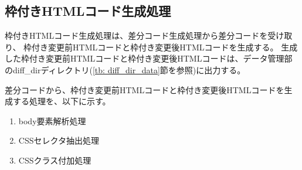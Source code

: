 
\subsection{枠付きHTMLコード生成処理}\label{subsec:modified_html_generate}
枠付きHTMLコード生成処理は、差分コード生成処理から差分コードを受け取り、
枠付き変更前HTMLコードと枠付き変更後HTMLコードを生成する。
生成した枠付き変更前HTMLコードと枠付き変更後HTMLコードは、データ管理部のdiff\_dirディレクトリ(\ref{tb: diff_dir_data}節を参照)に出力する。
\par
差分コードから、枠付き変更前HTMLコードと枠付き変更後HTMLコードを生成する処理を、以下に示す。
\begin{enumerate}
    \item body要素解析処理
    \item CSSセレクタ抽出処理
    \item CSSクラス付加処理
\end{enumerate}

